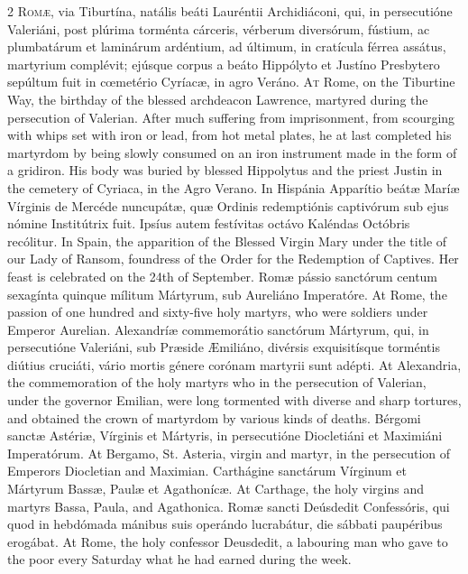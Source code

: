 \begin{paracol}{2}
\lettrine[lines=2]{R}{omæ,} via Tiburtína, 
 natális beáti Lauréntii Archidiáconi, qui, in persecutióne Valeriáni, post 
 plúrima torménta cárceris, vérberum diversórum, fústium, ac plumbatárum et 
 laminárum ardéntium, ad últimum, in cratícula férrea assátus, martyrium 
 complévit; ejúsque corpus a beáto Hippólyto et Justíno Presbytero sepúltum 
 fuit in cœmetério Cyríacæ, in agro Veráno.
\switchcolumn
{}
\lettrine[lines=2]{A}{t} Rome, on the Tiburtine Way, the 
 birthday of the blessed archdeacon Lawrence, martyred during the persecution 
 of Valerian. After much suffering from imprisonment, from scourging 
 with whips set with iron or lead, from hot metal plates, he at last 
 completed his martyrdom by being slowly consumed on an iron instrument made 
 in the form of a gridiron. His body was buried by blessed Hippolytus 
 and the priest Justin in the cemetery of Cyriaca, in the Agro Verano.
\switchcolumn*
{}
In Hispánia Apparítio 
 beátæ Maríæ Vírginis de Mercéde nuncupátæ, quæ Ordinis redemptiónis 
 captivórum sub ejus nómine Institútrix fuit. Ipsíus autem festívitas 
 octávo Kaléndas Octóbris recólitur.
\switchcolumn
{}
In Spain, the apparition of the 
 Blessed Virgin Mary under the title of our Lady of Ransom, foundress of the 
 Order for the Redemption of Captives. Her feast is celebrated on the 
 24th of September.
\switchcolumn*
{}
Romæ pássio sanctórum 
 centum sexagínta quinque mílitum Mártyrum, sub Aureliáno Imperatóre.
\switchcolumn
{}
At Rome, the passion of one hundred 
 and sixty-five holy martyrs, who were soldiers under Emperor Aurelian.
\switchcolumn*
{}
Alexandríæ commemorátio 
 sanctórum Mártyrum, qui, in persecutióne Valeriáni, sub Præside Æmiliáno, 
 divérsis exquisitísque torméntis diútius cruciáti, vário mortis génere 
 corónam martyrii sunt adépti.
\switchcolumn
{}
At Alexandria, the commemoration of 
 the holy martyrs who in the persecution of Valerian, under the governor 
 Emilian, were long tormented with diverse and sharp tortures, and obtained 
 the crown of martyrdom by various kinds of deaths.
\switchcolumn*
{}
Bérgomi sanctæ Astériæ, 
 Vírginis et Mártyris, in persecutióne Diocletiáni et Maximiáni Imperatórum.
\switchcolumn
{}
At Bergamo, St. Asteria, virgin and 
 martyr, in the persecution of Emperors Diocletian and Maximian.
\switchcolumn*
{}
Carthágine sanctárum 
 Vírginum et Mártyrum Bassæ, Paulæ et Agathonícæ.
\switchcolumn
{}
At Carthage, the holy virgins and 
 martyrs Bassa, Paula, and Agathonica.
\switchcolumn*
{}
Romæ sancti Deúsdedit 
 Confessóris, qui quod in hebdómada mánibus suis operándo lucrabátur, die 
 sábbati paupéribus erogábat.
\switchcolumn
{}
At Rome, the holy confessor 
 Deusdedit, a labouring man who gave to the poor every Saturday what he had 
 earned during the week.
\switchcolumn*
{}
\end{paracol}


